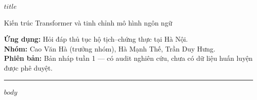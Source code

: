 \documentclass[11pt,a4paper]{article}
\begin{document}
{\LARGE\bfseries $title$\par}
\vspace{4pt}
{\large Kiến trúc Transformer và tinh chỉnh mô hình ngôn ngữ\par}
\vspace{4pt}
\textbf{Ứng dụng:} Hỏi đáp thủ tục hộ tịch–chứng thực tại Hà Nội.\\
\textbf{Nhóm:} Cao Văn Hà (trưởng nhóm), Hà Mạnh Thế, Trần Duy Hưng.\\
\textbf{Phiên bản:} Bản nháp tuần 1 — có audit nghiên cứu, chưa có dữ liệu huấn luyện được phê duyệt.
\vspace{5pt}\hrule\vspace{8pt}
$body$
\end{document}
